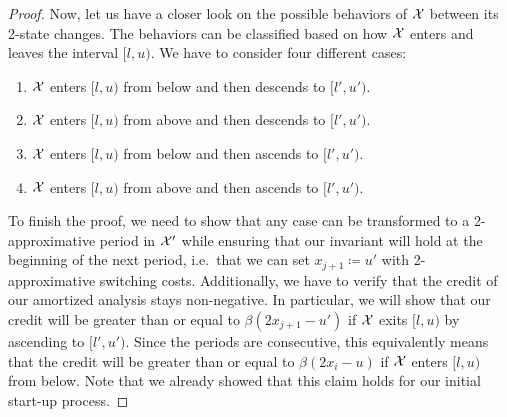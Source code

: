 \begin{proof}
Now, let us have a closer look on the possible behaviors of $\mathcal{X}$ between its 2-state changes. The behaviors can be classified based on how $\mathcal{X}$ enters and leaves the interval $[l,u)$. We have to consider four different cases:
\begin{enumerate}[label=(\alph*)]
	\item $\mathcal{X}$ enters $[l,u)$ from below and then descends to $[l',u')$.\label{itm:schedule_behavior_up_down}
	\item $\mathcal{X}$ enters $[l,u)$ from above and then descends to $[l',u')$.\label{itm:schedule_behavior_down_down}
	\item $\mathcal{X}$ enters $[l,u)$ from below and then ascends to $[l',u')$.\label{itm:schedule_behavior_up_up} 
	\item $\mathcal{X}$ enters $[l,u)$ from above and then ascends to $[l',u')$.\label{itm:schedule_behavior_down_up} 
\end{enumerate}
To finish the proof, we need to show that any case can be transformed to a 2-approximative period in $\mathcal{X}'$ while ensuring that our invariant will hold at the beginning of the next period, i.e.\ that we can set $x_{j+1}\coloneqq u'$ with 2-approximative switching costs. Additionally, we have to verify that the credit of our amortized analysis stays non-negative. In particular, we will show that our credit will be greater than or equal to $\beta(2x_{j+1}-u')$ if $\mathcal{X}$ exits $[l,u)$ by ascending to $[l',u')$. Since the periods are consecutive, this equivalently means that the credit will be greater than or equal to $\beta(2x_i-u)$ if $\mathcal{X}$ enters $[l,u)$ from below. Note that we already showed that this claim holds for our initial start-up process.
	

\end{proof}
